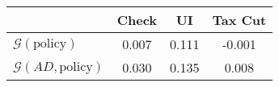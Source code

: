 \begin{tabular}{@{}lccc@{}} 
\toprule 
                          & Check      & UI    & Tax Cut    \\  \midrule 
$\mathcal{G}(\text{policy})$ & 0.007  & 0.111  & -0.001     \\ 
$\mathcal{G}(AD,\text{policy})$ & 0.030  & 0.135  & 0.008     \\ 
\end{tabular}  
